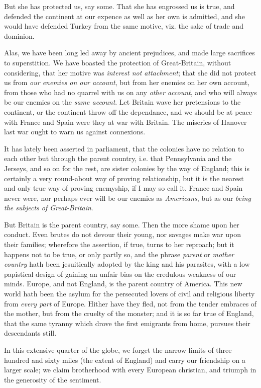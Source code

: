 \documentclass[12pt, twocolumn]{book}
\begin{document}
    But she has protected us, say some. That she has engrossed us is true, and defended the continent at our expence as well as her own is admitted, and she would have defended Turkey from the same motive, viz. the sake of trade and dominion.

    Alas, we have been long led away by ancient prejudices, and made large sacrifices to superstition. We have boasted the protection of Great-Britain, without considering, that her motive was \textit{interest not attachment}; that she did not protect us from \textit{our enemies on our account}, but from her enemies on her own account, from those who had no quarrel with us on any \textit{other account}, and who will always be our enemies on the \textit{same account}. Let Britain wave her pretensions to the continent, or the continent throw off the dependance, and we should be at peace with France and Spain were they at war with Britain. The miseries of Hanover last war ought to warn us against connexions.

    It has lately been asserted in parliament, that the colonies have no relation to each other but through the parent country, i.e. that Pennsylvania and the Jerseys, and so on for the rest, are sister colonies by the way of England; this is certainly a very round-about way of proving relationship, but it is the nearest and only true way of proving enemyship, if I may so call it. France and Spain never were, nor perhaps ever will be our enemies as \textit{Americans}, but as our \textit{being the subjects of Great-Britain}.

    But Britain is the parent country, say some. Then the more shame upon her conduct. Even brutes do not devour their young, nor savages make war upon their families; wherefore the assertion, if true, turns to her reproach; but it happens not to be true, or only partly so, and the phrase \textit{parent} or \textit{mother country} hath been jesuitically adopted by the king and his parasites, with a low papistical design of gaining an unfair bias on the credulous weakness of our minds. Europe, and not England, is the parent country of America. This new world hath been the asylum for the persecuted lovers of civil and religious liberty from \textit{every part} of Europe. Hither have they fled, not from the tender embraces of the mother, but from the cruelty of the monster; and it is so far true of England, that the same tyranny which drove the first emigrants from home, pursues their descendants still.

    In this extensive quarter of the globe, we forget the narrow limits of three hundred and sixty miles (the extent of England) and carry our friendship on a larger scale; we claim brotherhood with every European christian, and triumph in the generosity of the sentiment.
\end{document}
